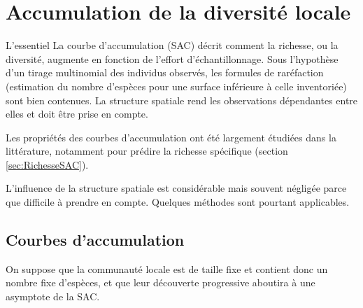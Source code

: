 \documentclass[
  11pt,
  french,
  a4paper,
  extrafontsizes,onecolumn,openright
  ]{memoir}
\newenvironment{Essentiel}
  {\begin{bclogo}[logo=\bctrombone, noborder=true, couleur=lightgray!50]{L'essentiel}\parindent0pt}
  {\end{bclogo}}
\begin{document}
\normalsize

\hypertarget{chap:Accumulation}{%
\chapter{Accumulation de la diversité locale}\label{chap:Accumulation}}

\scriptsize

\begin{Essentiel}
La courbe d'accumulation (SAC) décrit comment la richesse, ou la
diversité, augmente en fonction de l'effort d'échantillonnage. Sous
l'hypothèse d'un tirage multinomial des individus observés, les formules
de raréfaction (estimation du nombre d'espèces pour une surface
inférieure à celle inventoriée) sont bien contenues. La structure
spatiale rend les observations dépendantes entre elles et doit être
prise en compte.
\end{Essentiel}

\normalsize

Les propriétés des courbes d'accumulation ont été largement étudiées dans la littérature, notamment pour prédire la richesse spécifique (section \ref{sec:RichesseSAC}).

L'influence de la structure spatiale est considérable mais souvent négligée parce que difficile à prendre en compte.
Quelques méthodes sont pourtant applicables.

\hypertarget{courbes-daccumulation}{%
\section{Courbes d'accumulation}\label{courbes-daccumulation}}

On suppose que la communauté locale est de taille fixe et contient donc un nombre fixe d'espèces, et que leur découverte progressive aboutira à une asymptote de la SAC.



\scriptsize
\end{document}
